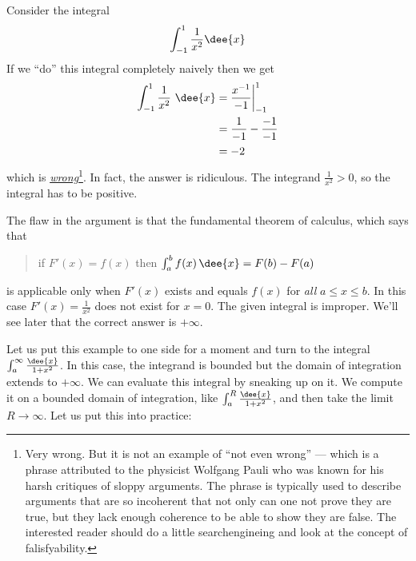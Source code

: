 \begin{eg}\label{eg:IMPtrap}
Consider the integral
\begin{align*}
  \int_{-1}^1 \frac{1}{x^2}\dee{x}
\end{align*}
If we ``do'' this integral completely naively then we get
\begin{align*}
  \int_{-1}^1\frac{1}{x^2}\ \dee{x}
  &= \frac{x^{-1}}{-1}\bigg|_{-1}^1\\
  &= \frac{1}{-1}-\frac{-1}{-1}\\
  &=-2
\end{align*}
which is \underline{\emph{wrong}}\footnote{Very wrong. But it is not an example of
``not even wrong'' --- which is a phrase attributed to the physicist Wolfgang Pauli who
was known for his harsh critiques of sloppy arguments. The phrase is typically
used to describe arguments that are so incoherent that not only can one
not prove they are true, but they lack enough coherence to be able to
show they are false. The interested reader should do a little searchengineing
and look at the concept of falisfyability.}. In fact, the answer is ridiculous.
The integrand $\frac{1}{x^2}>0$, so
the integral has to be positive.

The flaw in the argument is that the fundamental theorem of calculus, which says that
\begin{quote}
 if $F'(x)=f(x)$ then $\int_a^b f(x)\,\dee{x}=F(b)-F(a)$
\end{quote}
is applicable only when $F'(x)$ exists and equals $f(x)$ for \emph{all} $a\le x\le b$.
In this case $F'(x)=\frac{1}{x^2}$ does not exist for $x=0$. The given integral is
improper. We'll see later that the correct answer is $+\infty$.
\end{eg}
Let us put this example to one side for a moment and turn to the integral
$\int_a^\infty\frac{\dee{x}}{1+x^2}$. In this case, the integrand is bounded but the
domain of integration extends to $+\infty$. We can evaluate this integral by sneaking up
on it. We compute it on a  bounded domain of integration, like
$\int_a^R\frac{\dee{x}}{1+x^2}$, and then take the limit $R\rightarrow\infty$.
%
Let us put this into practice:
